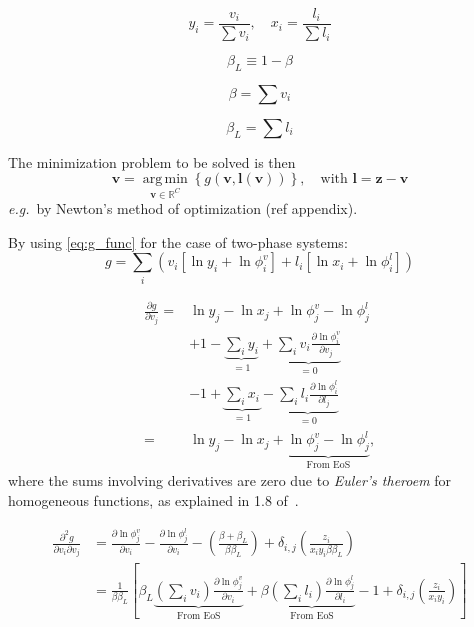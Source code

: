 \documentclass[english]{../thermomemo/thermomemo}
\newcommand*{\vektor}[1]{\boldsymbol{#1}}%
\DeclareMathOperator*{\argmin}{arg\,min }
\begin{document}
\begin{equation}
  y_i = \frac{v_i}{\sum v_i}, \quad x_i = \frac{l_i}{\sum l_i}
  \label{}
\end{equation}

\begin{equation}
  \beta_L \equiv 1-\beta
  \label{}
\end{equation}

\begin{equation}
  \beta = \sum v_i
  \label{}
\end{equation}

\begin{equation}
  \beta_L = \sum l_i
  \label{}
\end{equation}

The minimization problem to be solved is then 
\begin{equation}
  \vektor{v} = \underset{\vektor{v} \in \mathbb{R}^C}{\argmin}\left\{g(\vektor{v},\vektor{l}(\vektor{v}))\right\}, \quad\text{with } 
  \vektor{l} = \vektor{z}-\vektor{v}
  \label{}
\end{equation}
\textit{e.g.}\ by Newton's method of optimization (ref appendix).


By using \eqref{eq:g_func} for the case of two-phase systems:
\begin{equation}
  g = \sum_i \left( v_i \left[ \ln y_i + \ln \phi_i^v \right] + l_i \left[ \ln x_i + \ln \phi_i^l \right] \right)
  \label{eq:g_twophase}
\end{equation}

\begin{align}
  \frac{\partial g}{\partial v_j}
  =& \ln y_j - \ln x_j + \ln \phi_j^v - \ln \phi_j^l \nonumber\\
  &+ 1 - \underbrace{\sum_i y_i}_{=1} + \underbrace{\sum_i v_i \frac{\partial \ln \phi_i^v}{\partial v_j}}_{=0}\nonumber\\
  &- 1 + \underbrace{\sum_i x_i}_{=1} - \underbrace{\sum_i l_i \frac{\partial \ln \phi_i^l}{\partial l_j}}_{=0} \nonumber\\
  =& \ln y_j - \ln x_j + \underbrace{\ln \phi_j^v - \ln \phi_j^l}_{\text{From EoS}},
  \label{}
\end{align}
where the sums involving derivatives are zero due to \textit{Euler's theroem} for homogeneous functions, as explained in
1.8 of~\cite{michelsen07}.

\begin{align}
  \frac{\partial^2 g}{\partial v_i \partial v_j} 
  &= \frac{\partial \ln \phi_j^v}{\partial v_i} - \frac{\partial \ln \phi_j^l}{\partial v_i}  
  - \left( \frac{\beta + \beta_L}{\beta \beta_L} \right)
  + \delta_{i,j} \left( \frac{z_i}{x_i y_i \beta \beta_L} \right) \nonumber\\
  &= 
  \frac{1}{\beta \beta_L} \left[
  \beta_L \underbrace{\left( \sum_i v_i\right)  \frac{\partial \ln \phi_j^v}{\partial v_i} }_\text{From EoS}
  +  \beta \underbrace{\left( \sum_i l_i\right)  \frac{\partial \ln \phi_j^l}{\partial l_i}}_\text{From EoS}
  - 1
  + \delta_{i,j} \left( \frac{z_i}{x_i y_i} \right) 
  \right]\nonumber\\
  \label{}
\end{align}
\end{document}
